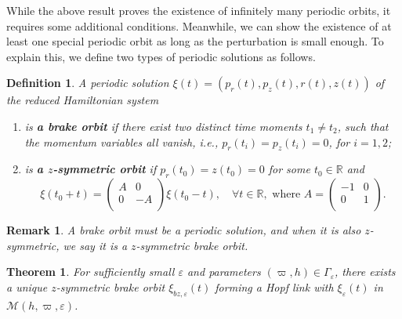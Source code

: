 \documentclass[11pt]{amsart}
\newcommand{\red}[1]{\color{red}#1\color{black}}
\newcommand{\ep}{\varepsilon}
\newcommand{\om}{\varpi}
\newtheorem{thm}{Theorem}[section]
\newtheorem{remark}{Remark}[section]
\newtheorem{defi}{Definition}[section]
\begin{document}
While the above result proves the existence of infinitely many periodic orbits, it requires some additional conditions. Meanwhile, we can show the existence of at least one special periodic orbit as long as the perturbation is small enough. 
To explain this, we define two types of periodic solutions as follows.  
\begin{defi} A periodic solution $\xi(t)=(p_{r}(t),p_{z}(t),r(t),z(t))$ of the reduced Hamiltonian system 
\begin{enumerate}
\item[(a)]  is \textbf{a brake orbit} if there exist two distinct time moments $t_1 \ne t_2$, such that the momentum variables all vanish, i.e., $p_r(t_i)=p_z(t_i)=0$, for $i =1,2$;
\item[(b)] is \textbf{a $z$-symmetric orbit} if $p_r(t_0)=z(t_0)=0$ for some $t_{0}\in\mathbb{R}$ and
\begin{equation}
	\xi(t_{0}+t)=\left({\begin{array}{cc}
			A & 0\\
			0 & -A\\
	\end{array}}\right)\xi(t_{0}-t),\quad \forall t\in\mathbb{R}, \text{ where } A=\left({\begin{array}{cc}
		-1 & 0\\
		0 & 1\\
\end{array}}\right).
\end{equation} 
\end{enumerate}
\end{defi} 
\begin{remark}
A brake orbit must be a periodic solution, and when it is also $z$-symmetric, we say it is a $z$-symmetric brake orbit.
\end{remark}
 
\begin{thm}\label{thm:z-sym exist}
	For sufficiently small $\ep$ and parameters $(\om,h) \in \Gamma_\ep$, there exists a unique $z$-symmetric brake orbit $\xi_{bz,\ep}(t)$ forming a Hopf link with $\xi_{\ep}(t)$ in $\mathcal{M}(h,\om,\ep)$.
\end{thm}
 
\end{document}
